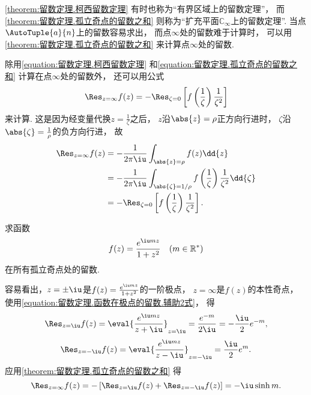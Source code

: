 \cref{theorem:留数定理.柯西留数定理}
有时也称为“有界区域上的留数定理”，
而\cref{theorem:留数定理.孤立奇点的留数之和}
则称为“扩充平面\(\mathbb{C}_\infty\)上的留数定理”.
当点\(\AutoTuple{a}{n}\)上的留数容易求出，
而点\(\infty\)处的留数难于计算时，
可以用\cref{theorem:留数定理.孤立奇点的留数之和}
来计算点\(\infty\)处的留数.

除用\cref{equation:留数定理.柯西留数定理}
和\cref{equation:留数定理.孤立奇点的留数之和}
计算在点\(\infty\)处的留数外，
还可以用公式\begin{equation}
	\Res_{z=\infty} f(z)
	= -\Res_{\zeta=0}
	\left[
		f\left(\frac{1}{\zeta}\right) \frac{1}{\zeta^2}
	\right]
\end{equation}来计算.
这是因为经变量代换\(z = \frac{1}{\zeta}\)之后，
\(z\)沿\(\abs{z}=\rho\)正方向行进时，
\(\zeta\)沿\(\abs{\zeta}=\frac{1}{\rho}\)的负方向行进，
故\begin{align*}
	\Res_{z=\infty} f(z)
	&= -\frac{1}{2\pi\iu}
		\int_{\abs{z}=\rho} f(z) \dd{z} \\
	&= -\frac{1}{2\pi\iu}
		\int_{\abs{\zeta}=1/\rho}
		f\left(\frac{1}{\zeta}\right)
		\frac{1}{\zeta^2} \dd{\zeta} \\
	&= -\Res_{\zeta=0} \left[ f\left(\frac{1}{\zeta}\right) \frac{1}{\zeta^2} \right].
\end{align*}

\begin{example}
求函数\begin{equation*}
	f(z) = \frac{e^{\iu mz}}{1+z^2} \quad(m\in\mathbb{R}^*)
\end{equation*}在所有孤立奇点处的留数.
\begin{solution}
容易看出，\(z=\pm\iu\)是\(f(z) = \frac{e^{\iu mz}}{1+z^2}\)的一阶极点，
\(z=\infty\)是\(f(z)\)的本性奇点，
使用\cref{equation:留数定理.函数在极点的留数.辅助2式}，
得\begin{equation*}
	\Res_{z=\iu} f(z)
	= \eval{\frac{e^{\iu mz}}{z+\iu}}_{z=\iu}
	= \frac{e^{-m}}{2\iu}
	= -\frac{\iu}{2} e^{-m},
\end{equation*}\begin{equation*}
	\Res_{z=-\iu} f(z)
	= \eval{\frac{e^{\iu mz}}{z-\iu}}_{z=-\iu}
	= \frac{\iu}{2} e^m.
\end{equation*}
应用\cref{theorem:留数定理.孤立奇点的留数之和} 得\begin{equation*}
	\Res_{z=\infty} f(z)
	= -\left[ \Res_{z=\iu} f(z) + \Res_{z=-\iu} f(z) \right]
	= -\iu \sinh m.
\end{equation*}
\end{solution}
\end{example}

